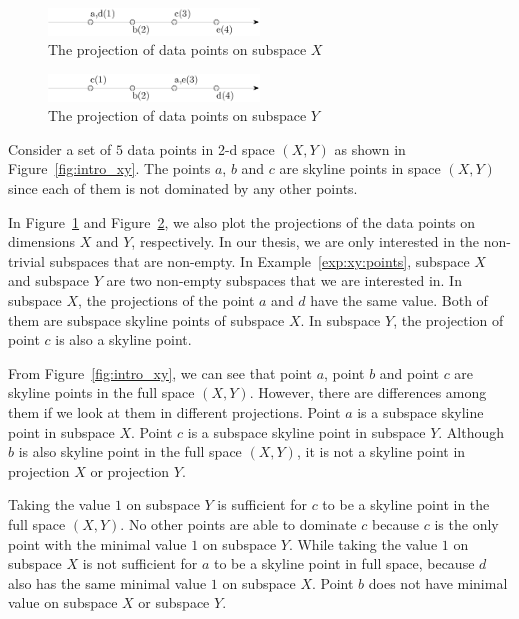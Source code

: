 \begin{figure}[H]
\centering
\includegraphics[width=0.5\textwidth]{figs/intro_x.eps}
\caption{The projection of data points on subspace $X$}
\label{fig:intro_x}
\end{figure}

\begin{figure}[H]
\centering
\includegraphics[width=0.5\textwidth]{figs/intro_y.eps}
\caption{The projection of data points on subspace $Y$}
\label{fig:intro_y}
\end{figure}

\begin{example} 
\label{exp:xy:points}
Consider a set of $5$ data points in 2-d space $(X, Y)$ as shown in Figure~\ref{fig:intro_xy}. The points $a$, $b$ and $c$ are skyline points in space $(X, Y)$ since each of them is not dominated by any other points.
\end{example}

In Figure~\ref{fig:intro_x} and Figure~\ref{fig:intro_y}, we also plot the projections of the data points on dimensions $X$ and $Y$, respectively. In our thesis, we are only interested in the non-trivial subspaces that are non-empty. In Example~\ref{exp:xy:points}, subspace $X$ and subspace $Y$ are two non-empty subspaces that we are interested in. In subspace $X$, the projections of the point $a$ and $d$ have the same value. Both of them are subspace skyline points of subspace $X$. In subspace $Y$, the projection of point $c$ is also a skyline point.

From Figure~\ref{fig:intro_xy}, we can see that point $a$, point $b$ and point $c$ are skyline points in the full space $(X, Y)$. However, there are differences among them if we look at them in different projections. Point $a$ is a subspace skyline point in subspace $X$. Point $c$ is a subspace skyline point in subspace $Y$. Although $b$ is also skyline point in the full space $(X, Y)$, it is not a skyline point in projection $X$ or projection $Y$.

Taking the value $1$ on subspace $Y$ is sufficient for $c$ to be a skyline point in the full space $(X, Y)$. No other points are able to dominate $c$ because $c$ is the only point with the minimal value $1$ on subspace $Y$. While taking the value $1$ on subspace $X$ is not sufficient for $a$ to be a skyline point in full space, because $d$ also has the same minimal value $1$ on subspace $X$. Point $b$ does not have minimal value on subspace $X$ or subspace $Y$.

